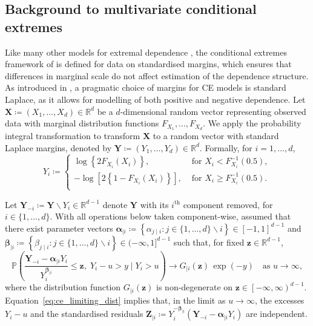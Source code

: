 \documentclass[preprint,12pt,authoryear]{elsarticle}
\begin{document}
\subsection{Background to multivariate conditional extremes}
\label{subsec:ce_model}

Like many other models for extremal dependence \citep[see, e.g.,][]{Davison2015}, the conditional extremes framework of \citet{Heffernan2004} is defined for data on standardised margins, which ensures that differences in marginal scale do not affect estimation of the dependence structure.
As introduced in \citet{Keef2013}, a pragmatic choice of margins for CE models is standard Laplace, as it allows for modelling of both positive and negative dependence.
Let $\boldsymbol{X} \coloneqq (X_1, \ldots, X_d) \in \mathbb{R}^d$ be a $d$-dimensional random vector representing observed data with marginal distribution functions $F_{X_1}, \ldots, F_{X_d}$.
We apply the probability integral transformation to transform $\boldsymbol{X}$ to a random vector with standard Laplace margins, denoted by $\boldsymbol{Y} \coloneqq (Y_1, \ldots, Y_d) \in \mathbb{R}^d$.
Formally, for $i = 1, \ldots, d$, 
\begin{equation}\label{eq:laplace}
  Y_i \coloneqq \begin{cases}
    \log\left\{2F_{X_i}(X_i)\right\}, &\text{ for } X_i < F_{X_i}^{-1}(0.5), \\
    -\log\left[2\left\{ 1 - F_{X_i}(X_i)\right\} \right], &\text{ for } X_i \ge F_{X_i}^{-1}(0.5). \\
  \end{cases}
\end{equation}

Let $\boldsymbol{Y}_{-i} \coloneq \boldsymbol{Y} \backslash Y_i \in \mathbb{R}^{d-1}$ denote $\boldsymbol{Y}$ with its $i^{\text{th}}$ component removed, for $i \in \{1, \ldots, d\}$.
With all operations below taken component-wise, \citet{Heffernan2004} assumed that there exist parameter vectors $\boldsymbol{\alpha}_{\mid i} \coloneqq \left\{\alpha_{j \mid i} : j\in\{1,\dots,d\}\backslash i \right\} \in [-1, 1]^{d-1}$ and $\boldsymbol{\beta}_{\mid i} \coloneqq \left\{\beta_{j \mid i} : j\in\{1,\dots,d\}\backslash i \right\} \in (-\infty, 1]^{d-1}$ such that, for fixed $\boldsymbol{z} \in \mathbb{R}^{d-1}$,
\begin{equation}\label{eq:ce_limiting_dist}
  \mathbb{P}\!\left(
  \frac{\boldsymbol{Y}_{-i} - \boldsymbol{\alpha}_{\mid i} Y_{i}}
  {Y_{i}^{\boldsymbol{\beta}_{\mid i}}}
  \le \boldsymbol{z},\; 
  Y_i - u > y \;\Big|\; Y_i > u
  \right)
  \longrightarrow
  G_{\mid i}(\boldsymbol{z})\,\exp{(-y)}
  \quad\text{as } u \to \infty,
\end{equation}
where the distribution function $G_{\mid i}\left(\boldsymbol{z}\right)$ is non-degenerate on $\boldsymbol{z} \in \left[ -\infty, \infty \right)^{d-1}$.
Equation~\eqref{eq:ce_limiting_dist} implies that, in the limit as $u\to\infty$, the excesses $Y_i-u$ and the standardised residuals 
$\boldsymbol{Z}_{\mid i} \coloneqq Y_i^{-\boldsymbol{\beta}_{\mid i}}\left(\boldsymbol{Y}_{-i} - \boldsymbol{\alpha}_{\mid i} Y_{i}\right)$ are independent.
\end{document}
